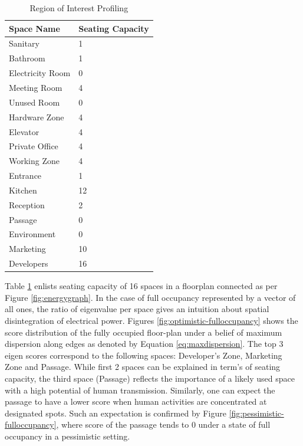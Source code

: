 \begin{table}[]
\centering
\begin{tabular}{|l|l|}
\hline
Space Name       & Seating Capacity \\ \hline
Sanitary     &  1    \\ \hline
Bathroom       & 1   \\ \hline
Electricity Room    & 0    \\ \hline
Meeting Room & 4   \\ \hline
Unused Room & 0 \\ \hline
Hardware Zone & 4   \\ \hline
Elevator & 4   \\ \hline
Private Office & 4 \\ \hline
Working Zone & 4 \\ \hline
Entrance & 1 \\ \hline
Kitchen & 12   \\ \hline
Reception & 2  \\ \hline
 {Passage}          &  {0}   \\ \hline
 {Environment}      &  {0}   \\ \hline
 {Marketing}        &  {10}  \\ \hline
 {Developers}       &  {16}   \\ \hline
\end{tabular}
\caption{Region of Interest Profiling}
\label{table:roiprofiling}
\end{table}




Table \ref{table:roiprofiling} enlists seating capacity of 16 spaces in a floorplan connected as per Figure \ref{fig:energygraph}.
In the case of full occupancy represented by a vector of all ones, the ratio of eigenvalue per space gives an intuition about spatial disintegration of electrical power. Figures \ref{fig:optimistic-fulloccupancy} shows the score distribution of the fully occupied floor-plan under a belief of maximum dispersion along edges as denoted by Equation \ref{eq:maxdispersion}. The top 3 eigen scores correspond to the following spaces: Developer's Zone, Marketing Zone and Passage. While first 2 spaces can be explained in term's of seating capacity, the third space (Passage) reflects the importance of a likely used space with a high potential of human transmission. Similarly, one can expect the passage to have a lower score when human activities are concentrated at designated spots. Such an expectation is confirmed by Figure \ref{fig:pessimistic-fulloccupancy}, where score of the passage tends to 0 under a state of full occupancy in a pessimistic setting. 



